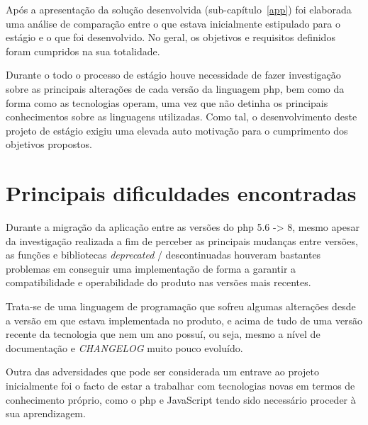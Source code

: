 Após a apresentação da solução desenvolvida (sub-capítulo~\ref{app}) foi elaborada uma análise de comparação entre o que estava inicialmente estipulado para o estágio e o que foi desenvolvido. No geral, os objetivos e requisitos definidos foram cumpridos na sua totalidade.

Durante o todo o processo de estágio houve necessidade de fazer investigação sobre as principais alterações de cada versão da linguagem \acrshort{php}, bem como da forma como as tecnologias operam, uma vez que não detinha os principais conhecimentos sobre as linguagens utilizadas. Como tal, o desenvolvimento deste projeto de estágio exigiu uma elevada auto motivação para o cumprimento dos objetivos propostos.


\section{Principais dificuldades encontradas}

Durante a migração da aplicação entre as versões do \acrshort{php} 5.6 -> 8, mesmo apesar da investigação realizada a fim de perceber as principais mudanças entre versões, as funções e bibliotecas \textit{deprecated} / descontinuadas houveram bastantes problemas em conseguir uma implementação de forma a garantir a compatibilidade e operabilidade do produto nas versões mais recentes.

Trata-se de uma linguagem de programação que sofreu algumas alterações desde a versão em que estava implementada no produto, e acima de tudo de uma versão recente da tecnologia que nem um ano possuí, ou seja, mesmo a nível de documentação e \textit{CHANGELOG} muito pouco evoluído.

Outra das adversidades que pode ser considerada um entrave ao projeto inicialmente foi o facto de estar a trabalhar com tecnologias novas em termos de conhecimento próprio, como o \acrshort{php} e JavaScript tendo sido necessário proceder à sua aprendizagem.

